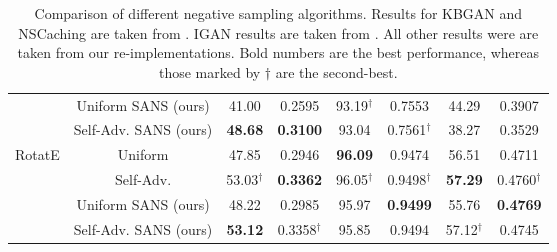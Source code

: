 \begin{table*}[h]
\begin{small}
\begin{tabular}{cccccccc}
& Uniform SANS (ours) & 41.00 & 0.2595 & 93.19$^\dagger$ & 0.7553 & 44.29 & 0.3907 \\
& Self-Adv. SANS (ours) & \textbf{48.68} & \textbf{0.3100} & 93.04 & 0.7561$^\dagger$ & 38.27 & 0.3529 \\
\hline
\multirow{3}{1cm}{\centering RotatE} & Uniform & 47.85 & 0.2946 & \textbf{96.09} & 0.9474 & 56.51 & 0.4711 \\
& Self-Adv. & 53.03$^\dagger$ & \textbf{0.3362} & 96.05$^\dagger$ & 0.9498$^\dagger$ & \textbf{57.29} & 0.4760$^\dagger$ \\
& Uniform SANS (ours) & 48.22 & 0.2985 & 95.97 & \textbf{0.9499} & 55.76 & \textbf{0.4769} \\
& Self-Adv. SANS (ours) & \textbf{53.12} & 0.3358$^\dagger$ & 95.85 & 0.9494 & 57.12$^\dagger$ & 0.4745 \\
\hline
\end{tabular}
\caption{Comparison of different negative sampling algorithms. Results for KBGAN and NSCaching are taken from \cite{zhang2019nscaching}. IGAN results are taken from \cite{wang2018incorporating}. 
All other results were are taken from our re-implementations. Bold numbers are the best performance, whereas those marked by $\dagger$ are the second-best. 
}
\label{tab:comparison1}
\end{small}
\end{table*}

